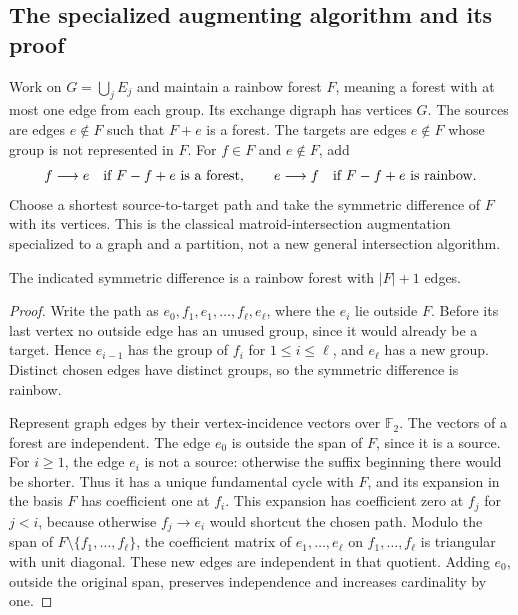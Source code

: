 \subsection{The specialized augmenting algorithm and its proof}

Work on $G=\bigcup_j E_j$ and maintain a rainbow forest $F$, meaning a
forest with at most one edge from each group.  Its exchange digraph has
vertices $G$.  The sources are edges $e\notin F$ such that $F+e$ is a
forest.  The targets are edges $e\notin F$ whose group is not represented
in $F$.  For $f\in F$ and $e\notin F$, add
\[
 f\longrightarrow e\quad\hbox{if }F-f+e\hbox{ is a forest},
 \qquad
 e\longrightarrow f\quad\hbox{if }F-f+e\hbox{ is rainbow}.
\]
Choose a shortest source-to-target path and take the symmetric difference
of $F$ with its vertices.  This is the classical matroid-intersection
augmentation specialized to a graph and a partition, not a new general
intersection algorithm.

\begin{lemma}
\label{lem:rainbow-augmentation}
The indicated symmetric difference is a rainbow forest with $|F|+1$ edges.
\end{lemma}
\begin{proof}
Write the path as
$e_0,f_1,e_1,\ldots,f_\ell,e_\ell$, where the $e_i$ lie outside $F$.
Before its last vertex no outside edge has an unused group, since it
would already be a target.  Hence $e_{i-1}$ has the group of $f_i$ for
$1\le i\le\ell$, and $e_\ell$ has a new group.  Distinct chosen edges
have distinct groups, so the symmetric difference is rainbow.

Represent graph edges by their vertex-incidence vectors over $\mathbb F_2$.
The vectors of a forest are independent.  The edge $e_0$ is outside the
span of $F$, since it is a source.  For $i\ge1$, the edge $e_i$ is not a
source: otherwise the suffix beginning there would be shorter.  Thus it
has a unique fundamental cycle with $F$, and its expansion in the basis
$F$ has coefficient one at $f_i$.  This expansion has coefficient zero
at $f_j$ for $j<i$, because otherwise $f_j\to e_i$ would shortcut the
chosen path.  Modulo the span of $F\setminus\{f_1,\ldots,f_\ell\}$,
the coefficient matrix of $e_1,\ldots,e_\ell$ on $f_1,\ldots,f_\ell$
is triangular with unit diagonal.  These new edges are independent in
that quotient.  Adding $e_0$, outside the original span, preserves
independence and increases cardinality by one.
\end{proof}

